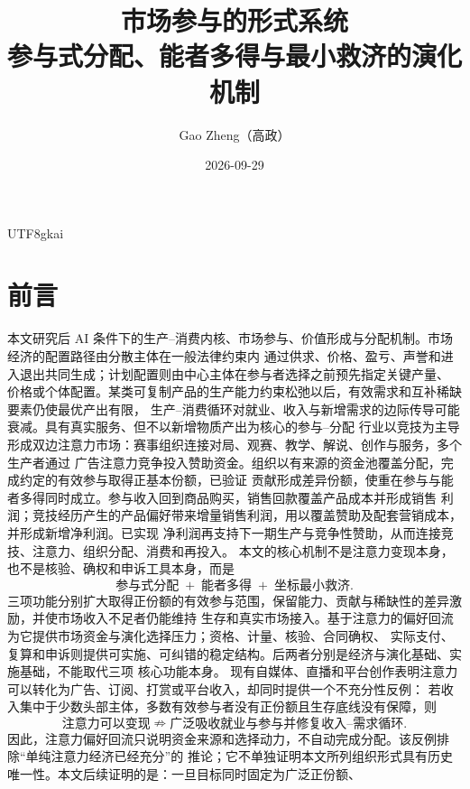 \documentclass[12pt,a4paper,openany]{report}
\begin{document}
\begin{CJK*}{UTF8}{gkai}

\title{市场参与的形式系统\\
\large 参与式分配、能者多得与最小救济的演化机制}
\author{Gao Zheng（高政）}
\date{2026-09-29}
\maketitle
\setcounter{page}{2}

\chapter*{前言}

本文研究后 AI 条件下的生产--消费内核、市场参与、价值形成与分配机制。市场经济的配置路径由分散主体在一般法律约束内
通过供求、价格、盈亏、声誉和进入退出共同生成；计划配置则由中心主体在参与者选择之前预先指定关键产量、
价格或个体配置。某类可复制产品的生产能力约束松弛以后，有效需求和互补稀缺要素仍使最优产出有限，
生产--消费循环对就业、收入与新增需求的边际传导可能衰减。具有真实服务、但不以新增物质产出为核心的参与--分配
行业以竞技为主导形成双边注意力市场：赛事组织连接对局、观赛、教学、解说、创作与服务，多个生产者通过
广告注意力竞争投入赞助资金。组织以有来源的资金池覆盖分配，完成约定的有效参与取得正基本份额，已验证
贡献形成差异份额，使重在参与与能者多得同时成立。参与收入回到商品购买，销售回款覆盖产品成本并形成销售
利润；竞技经历产生的产品偏好带来增量销售利润，用以覆盖赞助及配套营销成本，并形成新增净利润。已实现
净利润再支持下一期生产与竞争性赞助，从而连接竞技、注意力、组织分配、消费和再投入。
本文的核心机制不是注意力变现本身，也不是核验、确权和申诉工具本身，而是
\[
\boxed{\text{参与式分配}\;+\;\text{能者多得}\;+\;\text{坐标最小救济}}.
\]
三项功能分别扩大取得正份额的有效参与范围，保留能力、贡献与稀缺性的差异激励，并使市场收入不足者仍能维持
生存和真实市场接入。基于注意力的偏好回流为它提供市场资金与演化选择压力；资格、计量、核验、合同确权、
实际支付、复算和申诉则提供可实施、可纠错的稳定结构。后两者分别是经济与演化基础、实施基础，不能取代三项
核心功能本身。
现有自媒体、直播和平台创作表明注意力可以转化为广告、订阅、打赏或平台收入，却同时提供一个不充分性反例：
若收入集中于少数头部主体，多数有效参与者没有正份额且生存底线没有保障，则
\[
  \text{注意力可以变现}
  \nRightarrow
  \text{广泛吸收就业与参与并修复收入--需求循环}.
\]
因此，注意力偏好回流只说明资金来源和选择动力，不自动完成分配。该反例排除“单纯注意力经济已经充分”的
推论；它不单独证明本文所列组织形式具有历史唯一性。本文后续证明的是：一旦目标同时固定为广泛正份额、

\end{CJK*}
\end{document}
